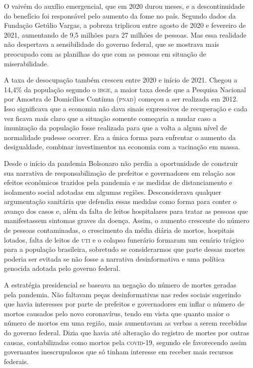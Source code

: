 O vaivém do auxílio emergencial, que em 2020 durou meses, e a
descontinuidade do benefício foi responsável pelo aumento da fome no
país. Segundo dados da Fundação Getúlio Vargas, a pobreza triplicou
entre agosto de 2020 e fevereiro de 2021, aumentando de 9,5 milhões para
27 milhões de pessoas. Mas essa realidade não despertava a sensibilidade
do governo federal, que se mostrava mais preocupado com as planilhas do
que com as pessoas em situação de miserabilidade.

A taxa de desocupação também cresceu entre 2020 e início de 2021. Chegou
a 14,4\% da população segundo o \textsc{ibge}, a maior taxa desde que a Pesquisa
Nacional por Amostra de Domicílios Contínua (\textsc{pnad}) começou a ser
realizada em 2012. Isso significava que a economia não dava sinais
expressivos de recuperação e cada vez ficava mais claro que a situação
somente começaria a mudar caso a imunização da população fosse realizada
para que a volta a algum nível de normalidade pudesse ocorrer. Era a
única forma para enfrentar o aumento da desigualdade, combinar
investimentos na economia com a vacinação em massa.

Desde o início da pandemia Bolsonaro não perdia a oportunidade de
construir sua narrativa de responsabilização de prefeitos e governadores
em relação aos efeitos econômicos trazidos pela pandemia e as medidas de
distanciamento e isolamento social adotadas em algumas regiões.
Desconsiderava qualquer argumentação sanitária que defendia essas
medidas como forma para conter o avanço dos casos e, além da falta de
leitos hospitalares para tratar as pessoas que manifestassem sintomas
graves da doença. Assim, o aumento crescente do número de pessoas
contaminadas, o crescimento da média diária de mortos, hospitais
lotados, falta de leitos de \textsc{uti} e o colapso funerário formaram um
cenário trágico para a população brasileira, sobretudo se considerarmos
que parte dessas mortes poderia ser evitada se não fosse a narrativa
desinformativa e uma política genocida adotada pelo governo federal.

A estratégia presidencial se baseava na negação do número de mortes
geradas pela pandemia. Não faltavam peças desinformativas nas redes
sociais sugerindo que havia interesses por parte de prefeitos e
governadores em inflar o número de mortos causados pelo novo
coronavírus, tendo em vista que quanto maior o número de mortos em uma
região, mais aumentavam as verbas a serem recebidas do governo federal.
Dizia que havia até alteração do registro de mortes por outras causas,
contabilizadas como mortos pela \textsc{covid-19}, segundo ele favorecendo assim
governantes inescrupulosos que só tinham interesse em receber mais
recursos federais.

